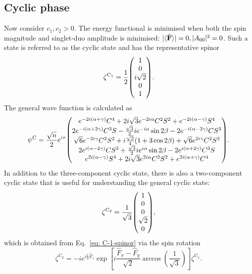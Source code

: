 \subsection{Cyclic phase}
Now consider \(c_1, c_2 > 0\).
The energy functional is minimised when both the spin magnitude and singlet-duo
amplitude is minimised: \(|\langle \hat{\vb{F}} \rangle | = 0, |A_{00}|^2=0\).
Such a state is referred to as the cyclic state and has the representative
spinor
\begin{equation}
    \zeta^{\text{C}_1} = \frac{1}{2}\mqty(1 \\ 0 \\ i\sqrt{2} \\ 0 \\ 1).
    \label{eq: C-1-spinor}
\end{equation}
The general wave function is calculated as
\begin{equation}\label{eq: general-cyclic-wfn}
    \psi^\mathrm{C} = \frac{\sqrt{n}}{2}e^{i\tau} \mqty(
    e^{-2i(\alpha+\gamma)}C^4 + 2i\sqrt{3}e^{-2i\alpha}C^2S^2
    + e^{-2i(\alpha-\gamma)}S^4
    \\
    2e^{-i(\alpha+2\gamma)}C^3S - \frac{\sqrt{3}}{2}ie^{-i\alpha}\sin 2\beta
    - 2e^{-i(\alpha-2\gamma)}CS^3
    \\
    \sqrt{6}e^{-2i\gamma}C^2S^2 + i\frac{\sqrt{2}}{4}(1+3\cos 2\beta)
    + \sqrt{6}e^{2i\gamma}C^2S^2
    \\
    2e^{i(\alpha-2\gamma)}CS^3 + \frac{\sqrt{3}}{2}ie^{i\alpha}\sin 2\beta
    - 2e^{i(\alpha+2\gamma)}C^3S
    \\
    e^{2i(\alpha-\gamma)}S^4 + 2i\sqrt{3}e^{2i\alpha}C^2S^2
    + e^{2i(\alpha+\gamma)}C^4
    ).
\end{equation}
In addition to the three-component cyclic state, there is also a two-component
cyclic state that is useful for understanding the general cyclic state:
\begin{equation}
    \zeta^{\text{C}_2} = \frac{1}{\sqrt{3}}\mqty(1  \\ 0 \\ 0 \\ \sqrt{2} \\ 0),
    \label{eq: C-2-spinor}
\end{equation}
which is obtained from Eq.~\eqref{eq: C-1-spinor} via the spin
rotation~\cite{Kawaguchi2012}
\begin{equation}\label{eq: cyclic-spin-rotation}
    \zeta^{\text{C}_2} = -ie^{i\frac{\pi}{4}\hat{F}_z}
    \exp\left[i\frac{\hat{F}_x-\hat{F}_y}{\sqrt{2}}
        \arccos{\left(\frac{1}{\sqrt{3}}\right)}\right]\zeta^{\text{C}_1}.
\end{equation}

